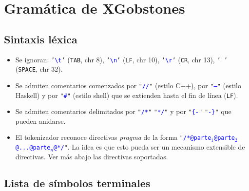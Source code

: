\documentclass{article}
\begin{document}
\newcommand{\chr}[1]{\texttt{'}\textcolor{blue}{\texttt{#1}}\texttt{'}}
\newcommand{\str}[1]{\texttt{"}\textcolor{blue}{\texttt{#1}}\texttt{"}}
\newcommand{\tok}[1]{\textcolor{red}{\texttt{#1}}}
\newcommand{\symbolentry}[3]{#1 & #2 && #3 \\}
\newcommand{\nb}[1]{\footnotesize{#1}}
\newcommand{\s}[1]{\textcolor{blue}{{\it$\langle$#1$\rangle$}}}
\newcommand{\nonEmpty}[1]{#1$_{1}$}
\newcommand{\produccion}[2]{
  \noindent
  \begin{tabularx}{\textwidth}{lrlr}
  #1 & $\xrightarrow{\hspace{.5cm}}$ & #2
  \end{tabularx}\\
}
\newcommand{\EMPTY}{$\epsilon$}
\newcommand{\ALT}{
  \\ & $\mid$ &
}
\newcommand{\ALTA}{
  $\mid$
}
\newcommand{\TODO}[1]{\textcolor{red}{****#1****}}
\section{Gram\'atica de XGobstones}

\subsection{Sintaxis l\'exica}

\begin{itemize}
\item Se ignoran:
\chr{\textbackslash t} (\texttt{TAB}, chr 8),
\chr{\textbackslash n} (\texttt{LF}, chr 10),
\chr{\textbackslash r} (\texttt{CR}, chr 13),
\chr{\,} (\texttt{SPACE}, chr 32).
\item Se admiten comentarios comenzados por \str{//} (estilo C++), por \str{--} (estilo Haskell) y por \str{\#} (estilo shell) que se extienden hasta el fin de l\'inea (\texttt{LF}).
\item Se admiten comentarios delimitados por \str{/*} \str{*/} y por \str{\{-} \str{-\}} que pueden anidarse.
\item El tokenizador reconoce directivas {\em pragma} de la forma \str{/*@parte$_1$@parte$_2$@...@parte$_n$@*/}. La idea es que esto pueda ser un mecanismo extensible de directivas. Ver m\'as abajo las directivas soportadas.
\end{itemize}


\subsection{Lista de s\'imbolos terminales}
\end{document}
